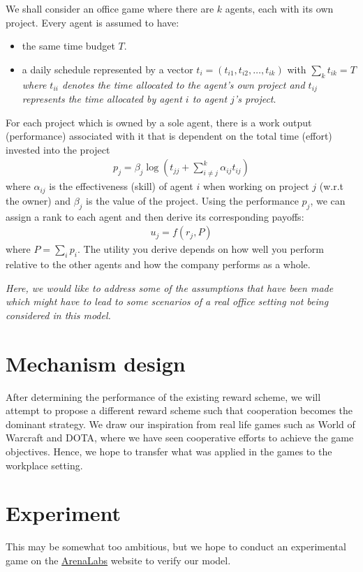 \documentclass[11pt, a4paper]{article}
\begin{document}
		We shall consider an office game where there are $k$ agents, each with its own project. Every agent is assumed to have:
	\begin{itemize}
		\item the same time budget $T$.
		\item a daily schedule represented by a vector $t_i=(t_{i1},t_{i2},\ldots,t_{ik})$ with $\sum_{k}t_{ik}=T$ \emph{where $t_{ii}$ denotes the time allocated to the agent's own project and $t_{ij}$ represents the time allocated by agent $i$ to agent $j$'s project}.	
		\end{itemize}
	
	For each project which is owned by a sole agent, there is a work output (performance) associated with it that is dependent on the total time (effort) invested into the project
	\begin{align*}
	p_j = \beta_j\log\left(t_{jj}+\sum_{i\neq j}^{k}\alpha_{ij}t_{ij}\right)
	\end{align*}
	where $\alpha_{ij}$ is the effectiveness (skill) of agent $i$ when working on project $j$ (w.r.t the owner) and $\beta_{j}$ is the value of the project. Using the performance $p_j$, we can assign a rank to each agent and then derive its corresponding payoffs:
	\begin{align*}
	u_j=f(r_j, P)
	\end{align*}
	where $P=\sum_{i}p_i$. The utility you derive depends on how well you perform relative to the other agents and how the company performs as a whole. 
	
\emph{Here, we would like to address some of the assumptions that have been made which might have to lead to some scenarios of a real office setting not being considered in this model. }	
	\section{Mechanism design}
	After determining the performance of the existing reward scheme, we will attempt to propose a different reward scheme such that cooperation becomes the dominant strategy. We draw our inspiration from real life games such as World of Warcraft and DOTA, where we have seen cooperative efforts to achieve the game objectives. Hence, we hope to transfer what was applied in the games to the workplace setting.
	
	\section{Experiment}
	This may be somewhat too ambitious, but we hope to conduct an experimental game on the \href{http://arenalabs.co/}{ArenaLabs} website to verify our model.
	
\end{document}
